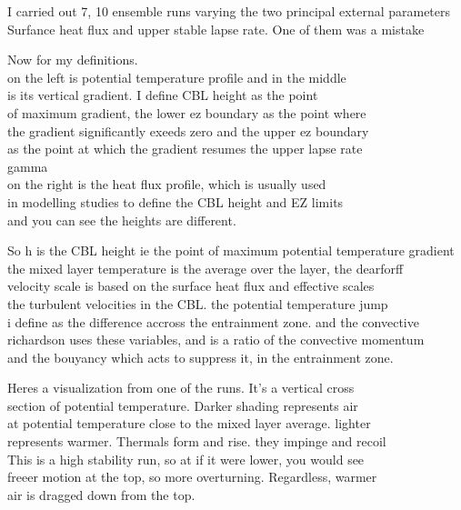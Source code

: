 \documentclass{beamer}
\begin{document}
\begin{frame}
I carried out 7, 10 ensemble runs varying the two principal external parameters\\
Surfance heat flux and upper stable lapse rate. One of them was a mistake
\end{frame}

\begin{frame}
Now for my definitions.\\
on the left is potential temperature profile and in the middle\\
is its vertical gradient.  I define CBL height as the point\\
of maximum gradient, the lower ez boundary as the point where\\
the gradient significantly exeeds zero and the upper ez boundary\\
as the point at which the gradient resumes the upper lapse rate\\
gamma\\
on the right is the heat flux profile, which is usually used\\
in modelling studies to define the CBL height and EZ limits\\
and you can see the heights are different.\\
\end{frame}

\begin{frame}
So h is the CBL height ie the point of maximum potential temperature gradient\\
the mixed layer temperature is the average over the layer, the dearforff\\
velocity scale is based on the surface heat flux and effective scales\\
the turbulent velocities in the CBL.  the potential temperature jump\\
i define as the difference accross the entrainment zone.  and the convective\\
richardson uses these variables, and is a ratio of the convective momentum\\
and the bouyancy which acts to suppress it, in the entrainment zone.

\end{frame}

\begin{frame}
Heres a visualization from one of the runs.  It's a vertical cross\\
section of potential temperature.  Darker shading represents air \\
at potential temperature close to the mixed layer average.  lighter\\
represents warmer.  Thermals form and rise.  they impinge and recoil\\
This is a high stability run, so at if it were lower, you would see\\
freeer motion at the top, so more overturning.  Regardless, warmer\\
air is dragged down from the top.\\

\end{frame}
\end{document}
